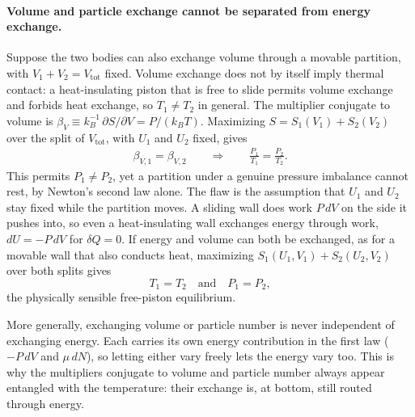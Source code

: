 \paragraph{Volume and particle exchange cannot be separated from energy exchange.}
Suppose the two bodies can also exchange volume through a movable partition,
with $V_1+V_2=V_{\text{tot}}$ fixed. Volume exchange does not by itself
imply thermal contact: a heat-insulating piston that is free to slide
permits volume exchange and forbids heat exchange, so $T_1\neq T_2$ in
general. The multiplier conjugate to volume is
$\beta_V\equiv k_B^{-1}\,\partial S/\partial V=P/(k_BT)$. Maximizing
$S=S_1(V_1)+S_2(V_2)$ over the split of $V_{\text{tot}}$, with $U_1$ and
$U_2$ fixed, gives
\begin{align*}
    \beta_{V,1}=\beta_{V,2}
    \qquad\Longrightarrow\qquad
    \frac{P_1}{T_1}=\frac{P_2}{T_2}.
\end{align*}
This permits $P_1\neq P_2$, yet a partition under a genuine pressure
imbalance cannot rest, by Newton's second law alone. The flaw is the
assumption that $U_1$ and $U_2$ stay fixed while the partition moves. A
sliding wall does work $P\,dV$ on the side it pushes into, so even a
heat-insulating wall exchanges energy through work, $dU=-P\,dV$ for
$\delta Q=0$. If energy and volume can both be exchanged, as for a movable
wall that also conducts heat, maximizing $S_1(U_1,V_1)+S_2(U_2,V_2)$ over
both splits gives
\begin{equation}
    \boxed{T_1=T_2 \quad\text{and}\quad P_1=P_2,}
\end{equation}
the physically sensible free-piston equilibrium.

More generally, exchanging volume or particle number is never independent of
exchanging energy. Each carries its own energy contribution in the first law
($-P\,dV$ and $\mu\,dN$), so letting either vary freely lets the energy vary
too. This is why the multipliers conjugate to volume and particle number
always appear entangled with the temperature: their exchange is, at bottom,
still routed through energy.